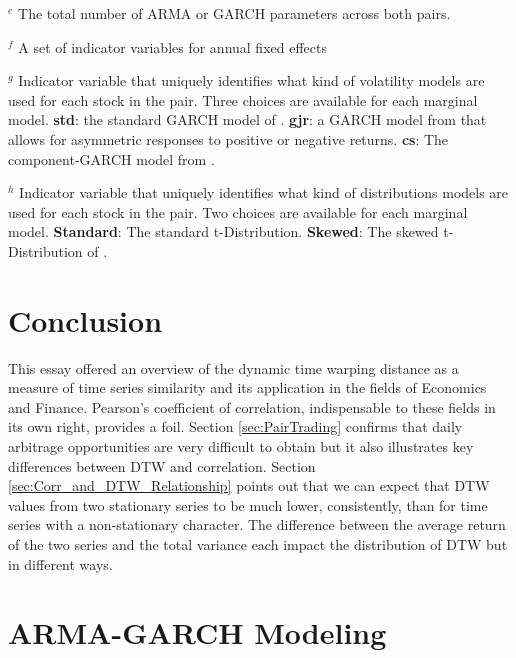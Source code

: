 \documentclass[12pt]{report}
\begin{document}
\begin{table}
\begin{tablenotes}
        \item {$^{e}$ The total number of ARMA or GARCH parameters across both pairs.}
        \item {$^{f}$ A set of indicator variables for annual fixed effects}
        \item {$^{g}$ Indicator variable that uniquely identifies what kind of volatility models are used for each stock in the pair. Three choices are available for each marginal model. \textbf{std}: the standard GARCH model of \cite{Bollerslev1986Garch}. \textbf{gjr}: a GARCH model from \cite{GJR1993Garch} that allows for asymmetric responses to positive or negative returns. \textbf{cs}: The component-GARCH model from \cite{EngleLee1993APA}.}
        \item {$^{h}$ Indicator variable that uniquely identifies what kind of distributions models are used for each stock in the pair. Two choices are available for each marginal model. \textbf{Standard}: The standard t-Distribution. \textbf{Skewed}: The skewed t-Distribution of \cite{FernandezSteel1998}.}
    \end{tablenotes}
    \label{tbl:correlation_to_log_dtw_regression_pearson}
\end{table}

\chapter{Conclusion} \label{sec:Conclusion}

This essay offered an overview of the dynamic time warping distance as a measure of time series similarity and its application in the fields of Economics and Finance. Pearson's coefficient of correlation, indispensable to these fields in its own right, provides a foil. Section \ref{sec:PairTrading} confirms that daily arbitrage opportunities are very difficult to obtain but it also illustrates key differences between DTW and correlation. Section \ref{sec:Corr_and_DTW_Relationship} points out that we can expect that DTW values from two stationary series to be much lower, consistently, than for time series with a non-stationary character. The difference between the average return of the two series and the total variance each impact the distribution of DTW but in different ways.  


\appendix 

\chapter{ARMA-GARCH Modeling} \label{sec:ARMAGARCH-benchmark}
\end{document}
